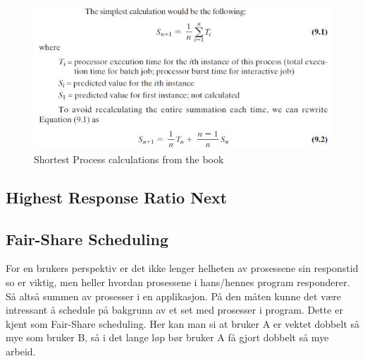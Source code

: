 \begin{figure}[h!]
\centering
\includegraphics{img/SPN.JPG}
\caption{Shortest Process calculations from the book}
\label{fig:spn}
\end{figure}

\subsection{Highest Response Ratio Next}
\subsection{Fair-Share Scheduling}
For en brukers perspektiv er det ikke lenger helheten av prosessene sin responstid so er viktig, men heller hvordan prosessene i hans/hennes program responderer. Så altså summen av prosesser i en applikasjon. På den måten kunne det være intressant å schedule på bakgrunn av et set med prosesser i program. Dette er kjent som Fair-Share scheduling. Her kan man si at bruker A er vektet dobbelt så mye som bruker B, så i det lange løp bør bruker A få gjort dobbelt så mye arbeid. 
